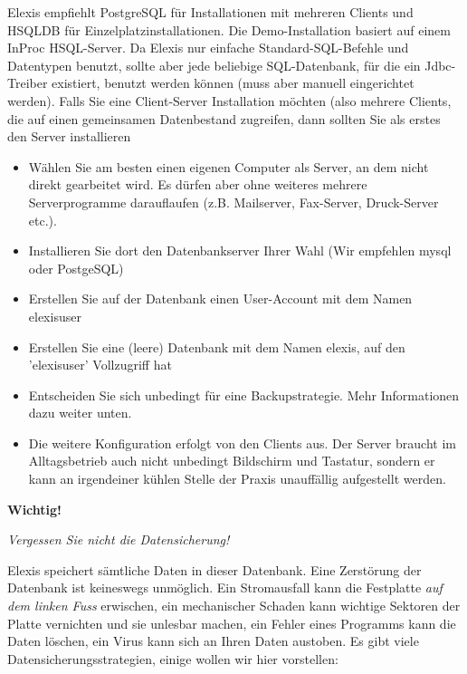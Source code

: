 Elexis empfiehlt PostgreSQL für Installationen mit mehreren Clients und HSQLDB für Einzelplatzinstallationen. Die Demo-Installation basiert auf einem InProc HSQL-Server. Da Elexis nur einfache Standard-SQL-Befehle und Datentypen benutzt, sollte aber jede beliebige SQL-Datenbank, für die ein Jdbc-Treiber existiert, benutzt werden können (muss aber manuell eingerichtet werden).
Falls Sie eine Client-Server Installation möchten (also mehrere Clients, die auf einen gemeinsamen Datenbestand zugreifen, dann sollten Sie als erstes den Server installieren
\begin{itemize}
 \item Wählen Sie am besten einen eigenen Computer als Server, an dem nicht direkt gearbeitet wird. Es dürfen aber ohne weiteres mehrere Serverprogramme darauflaufen (z.B. Mailserver, Fax-Server, Druck-Server etc.).
\item Installieren Sie dort den Datenbankserver Ihrer Wahl (Wir empfehlen mysql oder PostgeSQL)
\item Erstellen Sie auf der Datenbank einen User-Account mit dem Namen elexisuser
\item Erstellen Sie eine (leere) Datenbank mit dem Namen elexis, auf den 'elexisuser' Vollzugriff hat
\item Entscheiden Sie sich unbedingt für eine Backupstrategie. Mehr Informationen dazu weiter unten.
\item Die weitere Konfiguration erfolgt von den Clients aus. Der Server braucht im Alltagsbetrieb auch nicht unbedingt Bildschirm und Tastatur, sondern er kann an irgendeiner kühlen Stelle der Praxis unauffällig aufgestellt werden.
\end{itemize}

\textbf{Wichtig!}

\textit{Vergessen Sie nicht die Datensicherung!}

Elexis speichert sämtliche Daten in dieser Datenbank. Eine Zerstörung der Datenbank ist keineswegs unmöglich. Ein Stromausfall kann die Festplatte  \textit{auf dem linken Fuss}  erwischen, ein mechanischer Schaden kann wichtige Sektoren der Platte vernichten und sie unlesbar machen, ein Fehler eines Programms kann die Daten löschen, ein Virus kann sich an Ihren Daten austoben. Es gibt viele Datensicherungsstrategien, einige wollen wir hier vorstellen:


